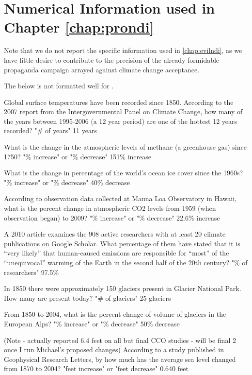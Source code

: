 \chapter{Numerical Information used in Chapter \ref{chap:prondi}}

Note that we do not report the specific information used in \ref{chap:evilndi},
as we have little desire to contribute to the precision of the already
formidable propaganda campaign arrayed against climate change acceptance.

The below is not formatted well for .


Global surface temperatures have been recorded since 1850. According to the 2007 report from the Intergovernmental Panel on Climate Change, how many of the years between 1995-2006 (a 12 year period) are one of the hottest 12 years recorded?
"\# of years"
11 years

What is the change in the atmospheric levels of methane (a greenhouse gas) since 1750?
"\% increase" or "\% decrease"
151\% increase

What is the change in percentage of the world's ocean ice cover since the 1960s?
"\% increase" or "\% decrease"
40\% decrease

According to observation data collected at Mauna Loa Observatory in Hawaii, what is the percent change in atmospheric CO2 levels from 1959 (when observation began) to 2009?
"\% increase" or "\% decrease"
22.6\% increase

A 2010 article examines the 908 active researchers with at least 20 climate publications on Google Scholar. What percentage of them have stated that it is “very likely” that human-caused emissions are responsible for “most” of the “unequivocal” warming of the Earth in the second half of the 20th century?
"\% of researchers"
97.5\%

In 1850 there were approximately 150 glaciers present in Glacier National Park. How many are present today?
"\# of glaciers"
25 glaciers

From 1850 to 2004, what is the percent change of volume of glaciers in the European Alps?
"\% increase" or "\% decrease"
50\% decrease

(Note - actually reported 6.4 feet on all but final CCO studies - will be final
2 once I run Michael's proposed changes)
According to a study published in Geophysical Research Letters, by how much has the average sea level changed from 1870 to 2004?
"feet increase" or "feet decrease"
0.640 feet

